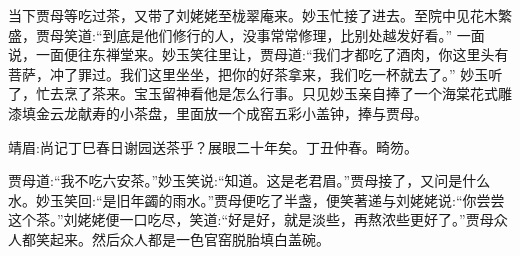 \begin{parag}
    当下贾母等吃过茶，又带了刘姥姥至栊翠庵来。妙玉忙接了进去。至院中见花木繁盛，贾母笑道:“到底是他们修行的人，没事常常修理，比别处越发好看。” 一面说，一面便往东禅堂来。妙玉笑往里让，贾母道:“我们才都吃了酒肉，你这里头有菩萨，冲了罪过。我们这里坐坐，把你的好茶拿来，我们吃一杯就去了。” 妙玉听了，忙去烹了茶来。宝玉留神看他是怎么行事。只见妙玉亲自捧了一个海棠花式雕漆填金云龙献寿的小茶盘，里面放一个成窑五彩小盖钟，捧与贾母。\begin{note}靖眉:尚记丁巳春日谢园送茶乎？展眼二十年矣。丁丑仲春。畸笏。\end{note}贾母道:“我不吃六安茶。”妙玉笑说:“知道。这是老君眉。”贾母接了，又问是什么水。妙玉笑回:“是旧年蠲的雨水。”贾母便吃了半盏，便笑著递与刘姥姥说:“你尝尝这个茶。”刘姥姥便一口吃尽，笑道:“好是好，就是淡些，再熬浓些更好了。”贾母众人都笑起来。然后众人都是一色官窑脱胎填白盖碗。
\end{parag}


